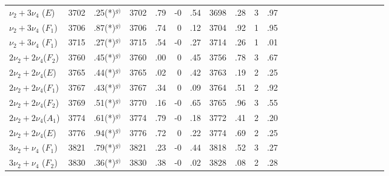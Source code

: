\begin{table}[p]
{{\begin{tabular}{l|r@{}lr@{}lr@{}lr@{}lr@{}l|r@{}lr@{}lr@{}l|r@{}lr@{}lr@{}l}
$\nu_2+3\nu_4$ ($E  $)& 3702&.25(*)$^{g)}$ & 3702&.79  &-0&.54  & 3698&.28 & 3&.97 &     &             &     &     &  &     &     &             &     &     &  &     \\
$\nu_2+3\nu_4$ ($F_1$)& 3706&.87(*)$^{g)}$ & 3706&.74  & 0&.12  & 3704&.92 & 1&.95 &     &             &     &     &  &     &     &             &     &     &  &     \\
$\nu_2+3\nu_4$ ($F_1$)& 3715&.27(*)$^{g)}$ & 3715&.54  &-0&.27  & 3714&.26 & 1&.01 &     &             &     &     &  &     &     &             &     &     &  &     \\
$2\nu_2+2\nu_4$($F_2$)& 3760&.45(*)$^{g)}$ & 3760&.00  & 0&.45  & 3756&.78 & 3&.67 &     &             &     &     &  &     &     &             &     &     &  &     \\
$2\nu_2+2\nu_4$($E  $)& 3765&.44(*)$^{g)}$ & 3765&.02  & 0&.42  & 3763&.19 & 2&.25 &     &             &     &     &  &     &     &             &     &     &  &     \\
$2\nu_2+2\nu_4$($F_1$)& 3767&.43(*)$^{g)}$ & 3767&.34  & 0&.09  & 3764&.51 & 2&.92 &     &             &     &     &  &     &     &             &     &     &  &     \\
$2\nu_2+2\nu_4$($F_2$)& 3769&.51(*)$^{g)}$ & 3770&.16  &-0&.65  & 3765&.96 & 3&.55 &     &             &     &     &  &     &     &             &     &     &  &     \\
$2\nu_2+2\nu_4$($A_1$)& 3774&.61(*)$^{g)}$ & 3774&.79  &-0&.18  & 3772&.41 & 2&.20 &     &             &     &     &  &     &     &             &     &     &  &     \\
$2\nu_2+2\nu_4$($E  $)& 3776&.94(*)$^{g)}$ & 3776&.72  & 0&.22  & 3774&.69 & 2&.25 &     &             &     &     &  &     &     &             &     &     &  &     \\
$3\nu_2+\nu_4$ ($F_1$)& 3821&.79(*)$^{g)}$ & 3821&.23  &-0&.44  & 3818&.52 & 3&.27 &     &             &     &     &  &     &     &             &     &     &  &     \\
$3\nu_2+\nu_4$ ($F_2$)& 3830&.36(*)$^{g)}$ & 3830&.38  &-0&.02  & 3828&.08 & 2&.28 &     &             &     &     &  &     &     &             &     &     &  &     \\
\hline\hline
\end{tabular}
}%
}
\endgroup
\end{table}

